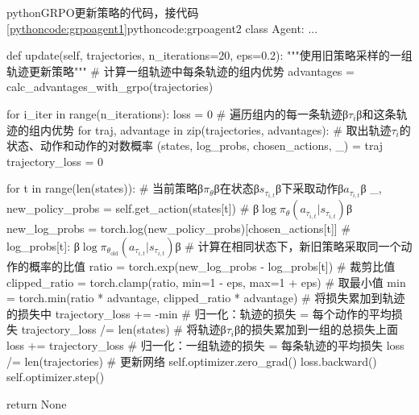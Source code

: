 \documentclass[lang=cn,newtx,10pt,scheme=chinese]{elegantbook}
\begin{document}
\begin{codebox}{python}{GRPO更新策略的代码，接代码\ref{pythoncode:grpoagent1}}{pythoncode:grpoagent2}
class Agent:
    ...

    def update(self, trajectories, n_iterations=20, eps=0.2):
        """使用旧策略采样的一组轨迹更新策略"""
        # 计算一组轨迹中每条轨迹的组内优势
        advantages = calc_advantages_with_grpo(trajectories)

        for i_iter in range(n_iterations):
            loss = 0
            # 遍历组内的每一条轨迹β$\tau_i$β和这条轨迹的组内优势
            for traj, advantage in zip(trajectories, advantages):
                # 取出轨迹$\tau_i$的状态、动作和动作的对数概率
                (states, log_probs, chosen_actions, _) = traj  
                trajectory_loss = 0

                for t in range(len(states)):
                    # 当前策略β$\pi_\theta$β在状态β$s_{\tau_{i,t}}$β下采取动作β$a_{\tau_{i,t}}$β
                    _, new_policy_probs = self.get_action(states[t])
                    # β$\log\pi_\theta(a_{\tau_{i,t}}|s_{\tau_{i,t}})$β
                    new_log_probs = torch.log(new_policy_probs)[chosen_actions[t]]
                    # log_probs[t]: β$\log\pi_{\theta_\text{old}}(a_{\tau_{i,t}}|s_{\tau_{i,t}})$β
                    # 计算在相同状态下，新旧策略采取同一个动作的概率的比值
                    ratio = torch.exp(new_log_probs - log_probs[t])
                    # 裁剪比值
                    clipped_ratio = torch.clamp(ratio, min=1 - eps, max=1 + eps)
                    # 取最小值
                    min = torch.min(ratio * advantage, clipped_ratio * advantage)
                    # 将损失累加到轨迹的损失中
                    trajectory_loss += -min
                # 归一化：轨迹的损失 = 每个动作的平均损失
                trajectory_loss /= len(states)
                # 将轨迹β$\tau_i$β的损失累加到一组的总损失上面
                loss += trajectory_loss
            # 归一化：一组轨迹的损失 = 每条轨迹的平均损失
            loss /= len(trajectories)
            # 更新网络
            self.optimizer.zero_grad()
            loss.backward()
            self.optimizer.step()

        return None
\end{codebox}
\end{document}
